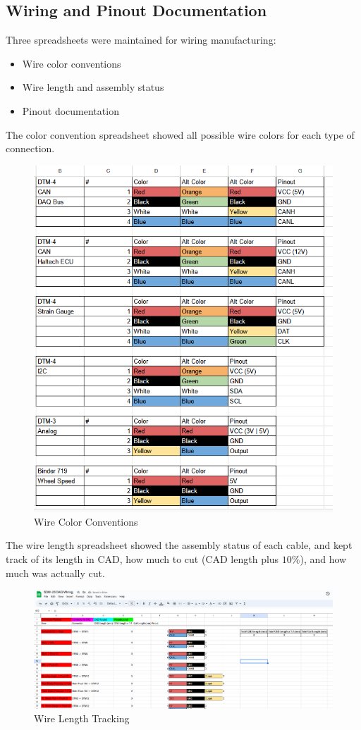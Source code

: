 \subsection{Wiring and Pinout Documentation}
Three spreadsheets were maintained for wiring manufacturing:
\begin{itemize}
    \item Wire color conventions
    \item Wire length and assembly status
    \item Pinout documentation
\end{itemize}
The color convention spreadsheet showed all possible wire colors for each type of connection.
\begin{figure}[H]
        \centering
        \includegraphics[width=5in]{images/colors.png}
        \caption{Wire Color Conventions}
        \label{fig:asfsfsfsfsfsfsf}
\end{figure}
The wire length spreadsheet showed the assembly status of each cable, and kept track of its length in CAD, how much to cut (CAD length plus $10\%$), and how much was actually cut.
\begin{figure}[H]
        \centering
        \includegraphics[width=7in]{images/wiring.png}
        \caption{Wire Length Tracking}
        \label{fig:fffsaf}
\end{figure}
